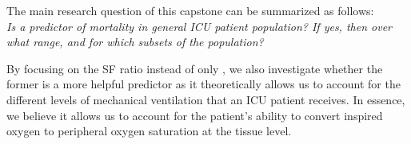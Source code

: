 The main research question of this capstone can be summarized as follows: \\
\textit{Is \SF a predictor of mortality in general ICU patient population? If yes, then over what range, and for which subsets of the population? 
}

By focusing on the SF ratio instead of only \Sp, we also investigate whether the former is a more helpful predictor as it theoretically allows us to account for the different levels of mechanical ventilation that an ICU patient receives. In essence, we believe it allows us to account for the patient's ability to convert inspired oxygen to peripheral oxygen saturation at the tissue level. 






